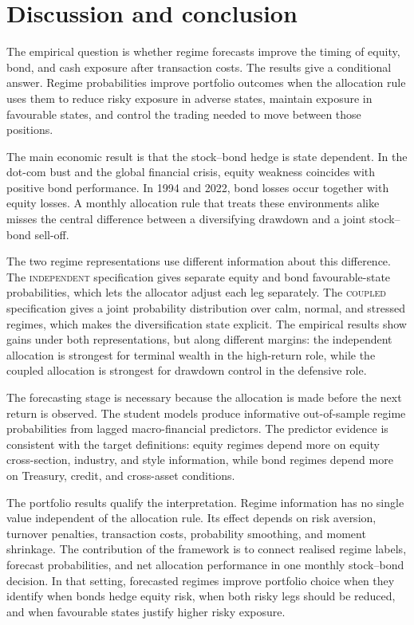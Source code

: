 \documentclass[10pt]{article}
\newcommand{\Acoup}{\textsc{coupled}}
\newcommand{\Bindep}{\textsc{independent}}
\begin{document}
\section{Discussion and conclusion}
\label{sec:conclusion}

The empirical question is whether regime forecasts improve the timing of equity, bond, and
cash exposure after transaction costs. The results give a conditional answer. Regime
probabilities improve portfolio outcomes when the allocation rule uses them to reduce risky
exposure in adverse states, maintain exposure in favourable states, and control the trading
needed to move between those positions.

The main economic result is that the stock--bond hedge is state dependent. In the dot-com
bust and the global financial crisis, equity weakness coincides with positive bond
performance. In 1994 and 2022, bond losses occur together with equity losses. A monthly
allocation rule that treats these environments alike misses the central difference between a
diversifying drawdown and a joint stock--bond sell-off.

The two regime representations use different information about this difference. The
\Bindep{} specification gives separate equity and bond favourable-state probabilities, which
lets the allocator adjust each leg separately. The \Acoup{} specification gives a joint
probability distribution over calm, normal, and stressed regimes, which makes the
diversification state explicit. The empirical results show gains under both representations,
but along different margins: the independent allocation is strongest for terminal wealth in
the high-return role, while the coupled allocation is strongest for drawdown control in the
defensive role.

The forecasting stage is necessary because the allocation is made before the next return is
observed. The student models produce informative out-of-sample regime probabilities from
lagged macro-financial predictors. The predictor evidence is consistent with the target
definitions: equity regimes depend more on equity cross-section, industry, and style
information, while bond regimes depend more on Treasury, credit, and cross-asset conditions.

The portfolio results qualify the interpretation. Regime information has no single value
independent of the allocation rule. Its effect depends on risk aversion, turnover penalties,
transaction costs, probability smoothing, and moment shrinkage. The contribution of the
framework is to connect realised regime labels, forecast probabilities, and net allocation
performance in one monthly stock--bond decision. In that setting, forecasted regimes improve
portfolio choice when they identify when bonds hedge equity risk, when both risky legs should
be reduced, and when favourable states justify higher risky exposure.

\appendix
\renewcommand{\thefigure}{\thesection.\arabic{figure}}
\renewcommand{\thetable}{\thesection.\arabic{table}}


\end{document}
